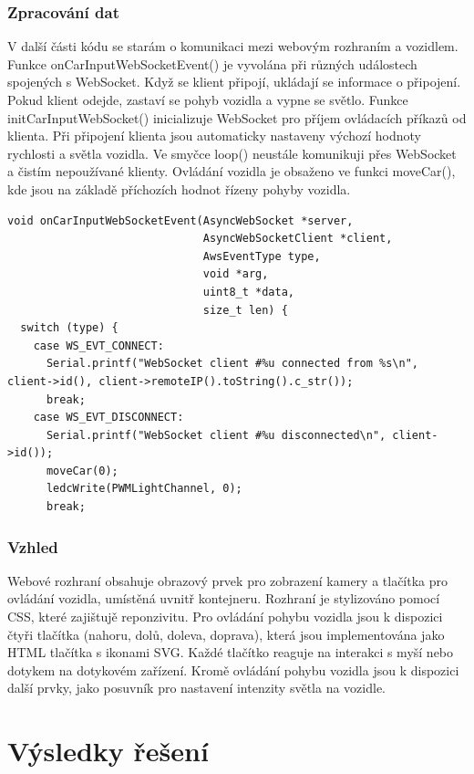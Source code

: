\documentclass[12pt, a4paper,
oneside,      %
openany
]{report}
\begin{document}
\subsection{Zpracování dat}
\noindent V další části kódu se starám o komunikaci mezi webovým rozhraním a vozidlem. Funkce onCarInputWebSocketEvent() je vyvolána při různých událostech spojených s WebSocket. Když se klient připojí, ukládají se informace o připojení. Pokud klient odejde, zastaví se pohyb vozidla a vypne se světlo. Funkce initCarInputWebSocket() inicializuje WebSocket pro příjem ovládacích příkazů od klienta. Při připojení klienta jsou automaticky nastaveny výchozí hodnoty rychlosti a světla vozidla. Ve smyčce loop() neustále komunikuji přes WebSocket a čistím nepoužívané klienty. Ovládání vozidla je obsaženo ve funkci moveCar(), kde jsou na základě příchozích hodnot řízeny pohyby vozidla.
\begin{lstlisting}[caption={Ukázka zpracování odpojení a připojení klienta}, label=lst:arduino]
void onCarInputWebSocketEvent(AsyncWebSocket *server,
                              AsyncWebSocketClient *client,
                              AwsEventType type,
                              void *arg,
                              uint8_t *data,
                              size_t len) {
  switch (type) {
    case WS_EVT_CONNECT:
      Serial.printf("WebSocket client #%u connected from %s\n", client->id(), client->remoteIP().toString().c_str());
      break;
    case WS_EVT_DISCONNECT:
      Serial.printf("WebSocket client #%u disconnected\n", client->id());
      moveCar(0);
      ledcWrite(PWMLightChannel, 0);
      break;
\end{lstlisting}
\subsection{Vzhled}
\noindent Webové rozhraní obsahuje obrazový prvek pro zobrazení kamery a tlačítka pro ovládání vozidla, umístěná uvnitř kontejneru. Rozhraní je stylizováno pomocí CSS, které zajištujě reponzivitu. Pro ovládání pohybu vozidla jsou k dispozici čtyři tlačítka (nahoru, dolů, doleva, doprava), která jsou implementována jako HTML tlačítka s ikonami SVG. Každé tlačítko reaguje na interakci s myší nebo dotykem na dotykovém zařízení. Kromě ovládání pohybu vozidla jsou k dispozici další prvky, jako posuvník pro nastavení intenzity světla na vozidle.

	\chapter{Výsledky řešení}
\end{document}
